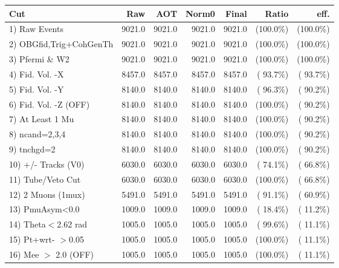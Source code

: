  \begin{table}[h!]\centering
 \begin{tabular}{||l||r|r|r|r|r|r||}
 \hline
 \hline
 Cut & Raw & AOT & Norm0 & Final & Ratio & eff.       \\
 \hline
  1) Raw Events           &       9021.0 &       9021.0 &       9021.0 &       9021.0 & (100.0\%) & (100.0\%) \\
  2) OBGfid,Trig+CohGenTh &       9021.0 &       9021.0 &       9021.0 &       9021.0 & (100.0\%) & (100.0\%) \\
  3) Pfermi \& W2         &       9021.0 &       9021.0 &       9021.0 &       9021.0 & (100.0\%) & (100.0\%) \\
  4) Fid. Vol. -X         &       8457.0 &       8457.0 &       8457.0 &       8457.0 & ( 93.7\%) & ( 93.7\%) \\
  5) Fid. Vol. -Y         &       8140.0 &       8140.0 &       8140.0 &       8140.0 & ( 96.3\%) & ( 90.2\%) \\
  6) Fid. Vol. -Z (OFF)   &       8140.0 &       8140.0 &       8140.0 &       8140.0 & (100.0\%) & ( 90.2\%) \\
  7) At Least 1 Mu        &       8140.0 &       8140.0 &       8140.0 &       8140.0 & (100.0\%) & ( 90.2\%) \\
  8) ncand=2,3,4          &       8140.0 &       8140.0 &       8140.0 &       8140.0 & (100.0\%) & ( 90.2\%) \\
  9) tnchgd=2             &       8140.0 &       8140.0 &       8140.0 &       8140.0 & (100.0\%) & ( 90.2\%) \\
 10) +/- Tracks (V0)      &       6030.0 &       6030.0 &       6030.0 &       6030.0 & ( 74.1\%) & ( 66.8\%) \\
 11) Tube/Veto Cut        &       6030.0 &       6030.0 &       6030.0 &       6030.0 & (100.0\%) & ( 66.8\%) \\
 12) 2 Muons (1mux)       &       5491.0 &       5491.0 &       5491.0 &       5491.0 & ( 91.1\%) & ( 60.9\%) \\
 13) PmuAsym<0.0          &       1009.0 &       1009.0 &       1009.0 &       1009.0 & ( 18.4\%) & ( 11.2\%) \\
 14) Theta$<$2.62 rad     &       1005.0 &       1005.0 &       1005.0 &       1005.0 & ( 99.6\%) & ( 11.1\%) \\
 15) Pt+wrt- $>$0.05      &       1005.0 &       1005.0 &       1005.0 &       1005.0 & (100.0\%) & ( 11.1\%) \\
 16) Mee $>$ 2.0  (OFF)   &       1005.0 &       1005.0 &       1005.0 &       1005.0 & (100.0\%) & ( 11.1\%) \\

\end{tabular}
\end{table}
